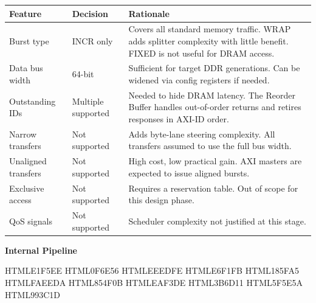 \documentclass[10pt]{article}
\begin{document}
\begin{tabular}{p{4.0cm} p{3.5cm} p{11cm}}
\toprule
\textbf{Feature} & \textbf{Decision} & \textbf{Rationale} \\
\midrule
Burst type          & INCR only          & Covers all standard memory traffic. WRAP adds splitter complexity with little benefit. FIXED is not useful for DRAM access. \\[3pt]
Data bus width      & 64-bit             & Sufficient for target DDR generations. Can be widened via config registers if needed. \\[3pt]
Outstanding IDs     & Multiple supported & Needed to hide DRAM latency. The Reorder Buffer handles out-of-order returns and retires responses in AXI-ID order. \\[3pt]
Narrow transfers    & Not supported      & Adds byte-lane steering complexity. All transfers assumed to use the full bus width. \\[3pt]
Unaligned transfers & Not supported      & High cost, low practical gain. AXI masters are expected to issue aligned bursts. \\[3pt]
Exclusive access    & Not supported      & Requires a reservation table. Out of scope for this design phase. \\[3pt]
QoS signals         & Not supported      & Scheduler complexity not justified at this stage. \\
\bottomrule
\end{tabular}

\noindent\textbf{\color{DfiD}Internal Pipeline}\par\vspace{6pt}

\definecolor{TealFill}    {HTML}{E1F5EE}
\definecolor{TealStroke}  {HTML}{0F6E56}
\definecolor{PurpleFill}  {HTML}{EEEDFE}
\definecolor{BlueFill}    {HTML}{E6F1FB}
\definecolor{BlueStroke}  {HTML}{185FA5}
\definecolor{AmberFill}   {HTML}{FAEEDA}
\definecolor{AmberStroke} {HTML}{854F0B}
\definecolor{GreenFill}   {HTML}{EAF3DE}
\definecolor{GreenStroke} {HTML}{3B6D11}
\definecolor{SigGray}     {HTML}{5F5E5A}
\definecolor{BypassRed}   {HTML}{993C1D}
\end{document}
